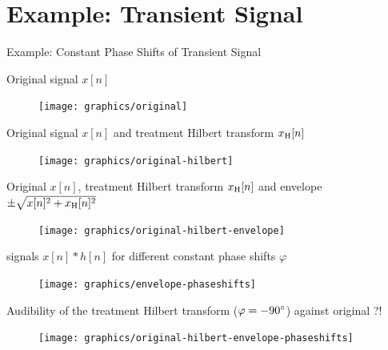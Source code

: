 \documentclass[mathserif]{intbeamer}
\begin{document}
\section{Example: Transient Signal}
\begin{frame}{Example: Constant Phase Shifts of Transient Signal}
{
Original signal $x[n]$
\begin{figure}
\texttt{[image: graphics/original]}
\end{figure}
}
{
Original signal $x[n]$ and treatment Hilbert transform $x_{\mathrm{H}}[n]$
\begin{figure}
\texttt{[image: graphics/original-hilbert]}
\end{figure}
}
{
Original $x[n]$, treatment Hilbert transform $x_{\mathrm{H}}[n]$ and envelope
$\pm\sqrt{x[n]^2+x_{\mathrm{H}}[n]^2}$
\begin{figure}
\texttt{[image: graphics/original-hilbert-envelope]}
\end{figure}
}
{
signals $x[n]\ast h[n]$ for different constant phase shifts $\varphi$
\begin{figure}
\texttt{[image: graphics/envelope-phaseshifts]}
\end{figure}
}
{
Audibility of the treatment Hilbert transform ($\varphi=-90\degree$) against original ?!
\begin{figure}
\texttt{[image: graphics/original-hilbert-envelope-phaseshifts]}
\end{figure}
}
\end{frame}
%
%
%
\end{document}
